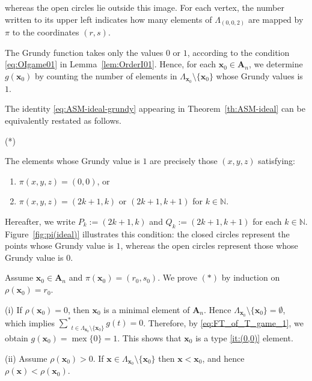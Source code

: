 \documentclass[a4paper,11pt]{amsart}
\theoremstyle{definition}
\newenvironment{demo}[1]{%
  \trivlist
  \item[\hskip\labelsep
        {\bf #1.}]
}{%
\hfill\qedsymbol
  \endtrivlist
}
\newcommand{\mex}{\operatorname{mex}}
\newcommand{\nimsum}{{\sum}^{*}}
\numberwithin{equation}{section}
\def\cqs{{(\lower1mm\hbox{*})}}
\newlength{\cqswidth}
\def\Non{\mathbb{N}}
\def\ASM#1{\boldsymbol{A}_{#1}}
\def\x{\boldsymbol{x}}
\def\rkf{\rho}
\begin{document}
whereas the open circles lie outside this image.
For each vertex,
the number written to its upper left indicates how many elements of $\Lambda_{(0, 0, 2)}$
are mapped by $\pi$ to the coordinates $(r,s)$.
%
\par
%
\begin{demo}{Proof of Theorem~\ref{th:ASM-ideal}}
%
The Grundy function takes only the values $0$ or $1$,
according to the condition \eqref{eq:OIgame01} in Lemma~\ref{lem:OrderI01}.
%
Hence, for each $\x_{0}\in\ASM{n}$, we determine $g(\x_{0})$
by counting the number of elements in
$\Lambda_{\x_{0}}\setminus\{\x_{0}\}$ whose Grundy values is $1$.
%
\par
%
The identity \eqref{eq:ASM-ideal-grundy} appearing in Theorem~\ref{th:ASM-ideal} can be equivalently restated as follows.
\par\smallskip\noindent
\cqs\hspace*{2ex}
\begin{minipage}[]{\textwidth-\cqswidth-2ex}
%
The elements whose Grundy value is $1$ are precisely those $(x,y,z)$ satisfying:
%
\begin{enumerate}[label=(\Alph*)]
\item\label{it:(0,0)}
$\pi(x,y,z)=(0,0)$, or
%
\item\label{it:odd-rank}
$\pi(x,y,z)=(2k+1,k)$ or $(2k+1,k+1)$ for $k\in\Non$.
\end{enumerate}
%
\end{minipage}
\par\smallskip\noindent
Hereafter, we write $P_{k}:=(2k+1,k)$ and $Q_{k}:=(2k+1,k+1)$ for each $k\in\Non$.
Figure~\ref{fig:pi(ideal)} illustrates this condition:
the closed circles represent the points whose Grundy value is $1$,
whereas the open circles represent those whose Grundy value is $0$.
%
\par
%
Assume $\x_{0}\in\ASM{n}$ and $\pi(\x_{0})=(r_{0},s_{0})$.
We prove $(*)$ by induction on $\rkf(\x_{0})=r_{0}$.
%
\par\noindent
(i) If $\rkf(\x_{0})=0$, then $\x_{0}$ is a minimal element of $\ASM{n}$.
Hence $\Lambda_{\x_{0}}\setminus\{\x_{0}\}=\emptyset$, which implies
$\underset{t\in\Lambda_{\x_{0}}\setminus\{\x_{0}\}}{\nimsum}g(t)=0$.
Therefore, by \eqref{eq:FT_of_T_game_1}, we obtain $g(\x_{0})=\mex\{0\}=1$.
This shows that $\x_{0}$ is a type \ref{it:(0,0)} element.
%
\par\noindent
(ii) Assume $\rkf(\x_{0})>0$.
If $\x\in\Lambda_{\x_{0}}\setminus\{\x_{0}\}$ then $\x<\x_{0}$, and hence $\rkf(\x)<\rkf(\x_{0})$.

\end{demo}
\end{document}
